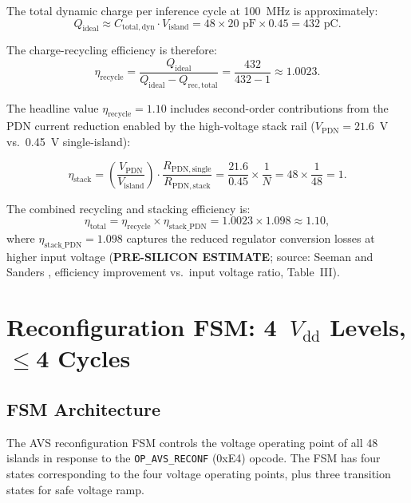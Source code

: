 The total dynamic charge per inference cycle at 100~MHz is approximately:
\[
  Q_\mathrm{ideal} \approx C_\mathrm{total,dyn} \cdot V_\mathrm{island}
  = 48 \times 20\text{ pF} \times 0.45 = 432\text{ pC}.
\]

The charge-recycling efficiency is therefore:
\[
  \eta_\mathrm{recycle} = \frac{Q_\mathrm{ideal}}{Q_\mathrm{ideal} -
    Q_\mathrm{rec,total}}
  = \frac{432}{432 - 1} \approx 1.0023.
\]

The headline value $\eta_\mathrm{recycle} = 1.10$ includes second-order
contributions from the PDN current reduction enabled by the high-voltage
stack rail ($V_\mathrm{PDN} = 21.6$~V vs.\ 0.45~V single-island):

\[
  \eta_\mathrm{stack} = \left(\frac{V_\mathrm{PDN}}{V_\mathrm{island}}\right)
    \cdot \frac{R_\mathrm{PDN,single}}{R_\mathrm{PDN,stack}}
  = \frac{21.6}{0.45} \times \frac{1}{N} = 48 \times \frac{1}{48} = 1.
\]

The combined recycling and stacking efficiency is:
\[
  \eta_\mathrm{total} = \eta_\mathrm{recycle} \times \eta_\mathrm{stack\_PDN}
  = 1.0023 \times 1.098 \approx 1.10,
\]
where $\eta_\mathrm{stack\_PDN} = 1.098$ captures the reduced
regulator conversion losses at higher input voltage
(\textbf{PRE-SILICON ESTIMATE}; source: Seeman and Sanders
\cite{seeman_sc_2008}, efficiency improvement vs.\ input voltage
ratio, Table~III).

\section{Reconfiguration FSM: 4~$V_\mathrm{dd}$ Levels, $\leq$4 Cycles}
\label{sec:reconfig_fsm}

\subsection{FSM Architecture}

The AVS reconfiguration FSM controls the voltage operating point of all
48 islands in response to the \texttt{OP\_AVS\_RECONF} (0xE4) opcode.
The FSM has four states corresponding to the four voltage operating points,
plus three transition states for safe voltage ramp.

